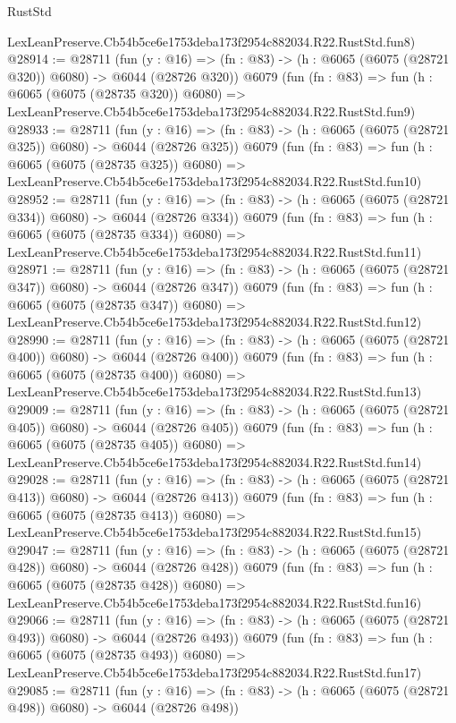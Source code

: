 \begin{lexlean}{RustStd}
\begin{coremodule}
    LexLeanPreserve.Cb54b5ce6e1753deba173f2954c882034.R22.RustStd.fun8)
@28914 := @28711
    (fun (y : @16) => (fn : @83) -> (h : @6065 (@6075 (@28721 @320)) @6080) -> @6044 (@28726 @320))
    @6079
    (fun (fn : @83) =>
    fun (h : @6065 (@6075 (@28735 @320)) @6080) =>
    LexLeanPreserve.Cb54b5ce6e1753deba173f2954c882034.R22.RustStd.fun9)
@28933 := @28711
    (fun (y : @16) => (fn : @83) -> (h : @6065 (@6075 (@28721 @325)) @6080) -> @6044 (@28726 @325))
    @6079
    (fun (fn : @83) =>
    fun (h : @6065 (@6075 (@28735 @325)) @6080) =>
    LexLeanPreserve.Cb54b5ce6e1753deba173f2954c882034.R22.RustStd.fun10)
@28952 := @28711
    (fun (y : @16) => (fn : @83) -> (h : @6065 (@6075 (@28721 @334)) @6080) -> @6044 (@28726 @334))
    @6079
    (fun (fn : @83) =>
    fun (h : @6065 (@6075 (@28735 @334)) @6080) =>
    LexLeanPreserve.Cb54b5ce6e1753deba173f2954c882034.R22.RustStd.fun11)
@28971 := @28711
    (fun (y : @16) => (fn : @83) -> (h : @6065 (@6075 (@28721 @347)) @6080) -> @6044 (@28726 @347))
    @6079
    (fun (fn : @83) =>
    fun (h : @6065 (@6075 (@28735 @347)) @6080) =>
    LexLeanPreserve.Cb54b5ce6e1753deba173f2954c882034.R22.RustStd.fun12)
@28990 := @28711
    (fun (y : @16) => (fn : @83) -> (h : @6065 (@6075 (@28721 @400)) @6080) -> @6044 (@28726 @400))
    @6079
    (fun (fn : @83) =>
    fun (h : @6065 (@6075 (@28735 @400)) @6080) =>
    LexLeanPreserve.Cb54b5ce6e1753deba173f2954c882034.R22.RustStd.fun13)
@29009 := @28711
    (fun (y : @16) => (fn : @83) -> (h : @6065 (@6075 (@28721 @405)) @6080) -> @6044 (@28726 @405))
    @6079
    (fun (fn : @83) =>
    fun (h : @6065 (@6075 (@28735 @405)) @6080) =>
    LexLeanPreserve.Cb54b5ce6e1753deba173f2954c882034.R22.RustStd.fun14)
@29028 := @28711
    (fun (y : @16) => (fn : @83) -> (h : @6065 (@6075 (@28721 @413)) @6080) -> @6044 (@28726 @413))
    @6079
    (fun (fn : @83) =>
    fun (h : @6065 (@6075 (@28735 @413)) @6080) =>
    LexLeanPreserve.Cb54b5ce6e1753deba173f2954c882034.R22.RustStd.fun15)
@29047 := @28711
    (fun (y : @16) => (fn : @83) -> (h : @6065 (@6075 (@28721 @428)) @6080) -> @6044 (@28726 @428))
    @6079
    (fun (fn : @83) =>
    fun (h : @6065 (@6075 (@28735 @428)) @6080) =>
    LexLeanPreserve.Cb54b5ce6e1753deba173f2954c882034.R22.RustStd.fun16)
@29066 := @28711
    (fun (y : @16) => (fn : @83) -> (h : @6065 (@6075 (@28721 @493)) @6080) -> @6044 (@28726 @493))
    @6079
    (fun (fn : @83) =>
    fun (h : @6065 (@6075 (@28735 @493)) @6080) =>
    LexLeanPreserve.Cb54b5ce6e1753deba173f2954c882034.R22.RustStd.fun17)
@29085 := @28711
    (fun (y : @16) => (fn : @83) -> (h : @6065 (@6075 (@28721 @498)) @6080) -> @6044 (@28726 @498))

\end{coremodule}
\end{lexlean}
